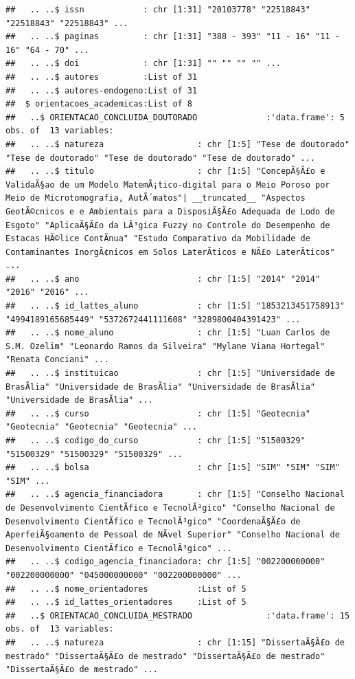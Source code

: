 \documentclass[]{article}
\begin{document}
\begin{verbatim}
##   .. ..$ issn            : chr [1:31] "20103778" "22518843" "22518843" "22518843" ...
##   .. ..$ paginas         : chr [1:31] "388 - 393" "11 - 16" "11 - 16" "64 - 70" ...
##   .. ..$ doi             : chr [1:31] "" "" "" "" ...
##   .. ..$ autores         :List of 31
##   .. ..$ autores-endogeno:List of 31
##  $ orientacoes_academicas:List of 8
##   ..$ ORIENTACAO_CONCLUIDA_DOUTORADO              :'data.frame': 5 obs. of  13 variables:
##   .. ..$ natureza                   : chr [1:5] "Tese de doutorado" "Tese de doutorado" "Tese de doutorado" "Tese de doutorado" ...
##   .. ..$ titulo                     : chr [1:5] "ConcepÃ§Ã£o e ValidaÃ§ao de um Modelo MatemÃ¡tico-digital para o Meio Poroso por Meio de Microtomografia, AutÃ´matos"| __truncated__ "Aspectos GeotÃ©cnicos e e Ambientais para a DisposiÃ§Ã£o Adequada de Lodo de Esgoto" "AplicaÃ§Ã£o da LÃ³gica Fuzzy no Controle do Desempenho de Estacas HÃ©lice ContÃ­nua" "Estudo Comparativo da Mobilidade de Contaminantes InorgÃ¢nicos em Solos LaterÃ­ticos e NÃ£o LaterÃ­ticos" ...
##   .. ..$ ano                        : chr [1:5] "2014" "2014" "2016" "2016" ...
##   .. ..$ id_lattes_aluno            : chr [1:5] "1853213451758913" "4994189165685449" "5372672441111608" "3289800404391423" ...
##   .. ..$ nome_aluno                 : chr [1:5] "Luan Carlos de S.M. Ozelim" "Leonardo Ramos da Silveira" "Mylane Viana Hortegal" "Renata Conciani" ...
##   .. ..$ instituicao                : chr [1:5] "Universidade de BrasÃ­lia" "Universidade de BrasÃ­lia" "Universidade de BrasÃ­lia" "Universidade de BrasÃ­lia" ...
##   .. ..$ curso                      : chr [1:5] "Geotecnia" "Geotecnia" "Geotecnia" "Geotecnia" ...
##   .. ..$ codigo_do_curso            : chr [1:5] "51500329" "51500329" "51500329" "51500329" ...
##   .. ..$ bolsa                      : chr [1:5] "SIM" "SIM" "SIM" "SIM" ...
##   .. ..$ agencia_financiadora       : chr [1:5] "Conselho Nacional de Desenvolvimento CientÃ­fico e TecnolÃ³gico" "Conselho Nacional de Desenvolvimento CientÃ­fico e TecnolÃ³gico" "CoordenaÃ§Ã£o de AperfeiÃ§oamento de Pessoal de NÃ­vel Superior" "Conselho Nacional de Desenvolvimento CientÃ­fico e TecnolÃ³gico" ...
##   .. ..$ codigo_agencia_financiadora: chr [1:5] "002200000000" "002200000000" "045000000000" "002200000000" ...
##   .. ..$ nome_orientadores          :List of 5
##   .. ..$ id_lattes_orientadores     :List of 5
##   ..$ ORIENTACAO_CONCLUIDA_MESTRADO               :'data.frame': 15 obs. of  13 variables:
##   .. ..$ natureza                   : chr [1:15] "DissertaÃ§Ã£o de mestrado" "DissertaÃ§Ã£o de mestrado" "DissertaÃ§Ã£o de mestrado" "DissertaÃ§Ã£o de mestrado" ...

\end{verbatim}
\end{document}
